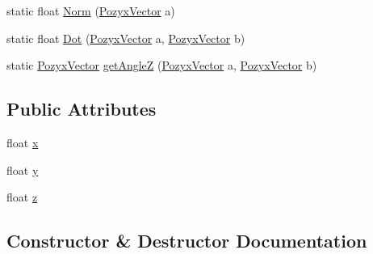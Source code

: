 \begin{DoxyCompactItemize}
\item 
static float \hyperlink{struct_pozyx_positioner_1_1_framework_1_1_pozyx_vector_a1dbaa4407ca3196f8b4de2d86e5ce395}{Norm} (\hyperlink{struct_pozyx_positioner_1_1_framework_1_1_pozyx_vector}{Pozyx\+Vector} a)
\item 
static float \hyperlink{struct_pozyx_positioner_1_1_framework_1_1_pozyx_vector_a9f39baf405504f414136b7f9a661dad8}{Dot} (\hyperlink{struct_pozyx_positioner_1_1_framework_1_1_pozyx_vector}{Pozyx\+Vector} a, \hyperlink{struct_pozyx_positioner_1_1_framework_1_1_pozyx_vector}{Pozyx\+Vector} b)
\item 
static \hyperlink{struct_pozyx_positioner_1_1_framework_1_1_pozyx_vector}{Pozyx\+Vector} \hyperlink{struct_pozyx_positioner_1_1_framework_1_1_pozyx_vector_a1ba057e7ddbad697e8a8ed6322f8fe7f}{get\+AngleZ} (\hyperlink{struct_pozyx_positioner_1_1_framework_1_1_pozyx_vector}{Pozyx\+Vector} a, \hyperlink{struct_pozyx_positioner_1_1_framework_1_1_pozyx_vector}{Pozyx\+Vector} b)
\end{DoxyCompactItemize}
\subsection*{Public Attributes}
\begin{DoxyCompactItemize}
\item 
float \hyperlink{struct_pozyx_positioner_1_1_framework_1_1_pozyx_vector_a8d0e8683da20dae755298604eefdae84}{x}
\item 
float \hyperlink{struct_pozyx_positioner_1_1_framework_1_1_pozyx_vector_a5e04e95828f39963731121bcb6f62a4c}{y}
\item 
float \hyperlink{struct_pozyx_positioner_1_1_framework_1_1_pozyx_vector_a1b44279d1786ffde514d431c1521c230}{z}
\end{DoxyCompactItemize}


\subsection{Constructor \& Destructor Documentation}
\mbox{\label{struct_pozyx_positioner_1_1_framework_1_1_pozyx_vector_ad7d351f29e438d7c2c914849c010df50}} 
